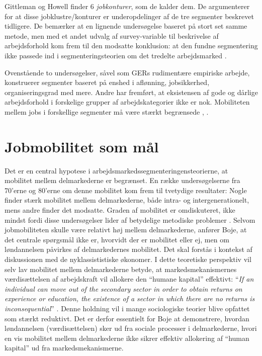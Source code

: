 Gittleman og Howell finder 6 \emph{jobkonturer}, som de kalder dem. De argumenterer for at disse jobklustre/konturer er underopdelinger af de tre segmenter beskrevet tidligere. De bemærker at en lignende undersøgelse baseret på stort set samme metode, men med et andet udvalg af survey-variable til beskrivelse af arbejdsforhold kom frem til den modsatte konklusion: at den fundne segmentering ikke passede ind i segmenteringsteorien om det tredelte arbejdsmarked \parencite[428]{Gittleman1995}. 

Ovenstående to undersøgelser, såvel som GERs rudimentære empiriske arbejde, konstruerer segmenter baseret på enshed i aflønning, jobsikkerhed, organiseringsgrad med mere.  
Andre har fremført, at eksistensen af gode og dårlige arbejdsforhold i forskelige grupper af arbejdskategorier ikke er nok. Mobiliteten mellem jobs i forskellige segmenter må være stærkt begrænsede \parencite[92]{Leontaridi1998}, \parencite[793]{DickensLang1985}. 

\section{Jobmobilitet som mål \label{teori_AST_jobmobmaal}}

Det er en central hypotese i arbejdsmarkedssegmenteringensteorierne, at mobilitet mellem delmarkederne er begrænset. En række undersøgelserne fra 70'erne og 80'erne om denne mobilitet kom frem til tvetydige resultater: Nogle finder  stærk mobilitet mellem delmarkederne, både intra- og intergenerationelt, mens andre finder det modsatte. Graden af mobilitet er omdiskuteret, ikke mindst fordi disse undersøgelser lider af betydelige metodiske problemer \parencite[80]{BojeToft1989}. Selvom jobmobiliteten skulle være relativt høj mellem delmarkederne, anfører Boje, at det centrale spørgsmål ikke er, hvorvidt der er mobilitet eller ej, men om løndannelsen påvirkes af delmarkedernes mobilitet. Det skal forstås i kontekst af diskussionen med de nyklassististiske økonomer. I dette teoretiske perspektiv vil selv lav mobilitet mellem delmarkederne betyde, at markedsmekanismernes værdisættelsen af arbejdskraft vil allokere den “humane kapital” effektivt:  “\emph{If an individual can move out of the secondary sector in order to obtain returns on experience or education, the existence of a sector in which there are no returns is inconsequential}” \parencite[793]{DickensLang1985}. Denne holdning vil i mange sociologiske teorier blive opfattet som stærkt reduktivt. Det er derfor essentielt for Boje at demonstrere, hvordan løndannelsen (værdisættelsen) sker ud fra sociale processer i delmarkederne, hvori en vis mobilitet mellem delmarkederne ikke sikrer effektiv allokering af “human kapital” ud fra markedsmekanismerne.

